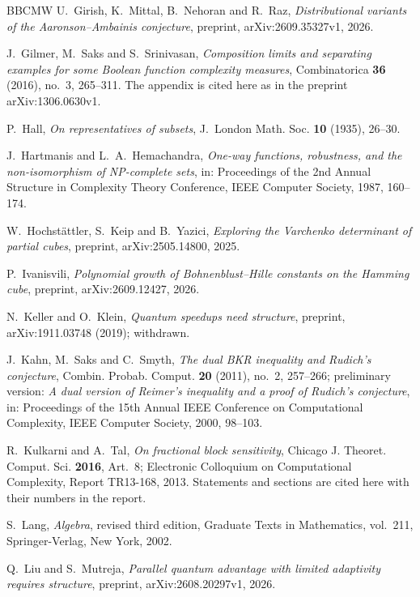 \documentclass[11pt,reqno]{amsart}
\theoremstyle{definition}
\theoremstyle{remark}
\numberwithin{equation}{section}
\theoremstyle{named}
\theoremstyle{plain}
\begin{document}
\begin{thebibliography}{BBCMW}
 U.~Girish, K.~Mittal, B.~Nehoran and R.~Raz, \emph{Distributional variants of the
Aaronson--Ambainis conjecture}, preprint, arXiv:2609.35327v1, 2026.

 J.~Gilmer, M.~Saks and S.~Srinivasan, \emph{Composition limits and separating
examples for some Boolean function complexity measures}, Combinatorica \textbf{36} (2016), no.~3,
265--311. The appendix is cited here as in the preprint arXiv:1306.0630v1.

 P.~Hall, \emph{On representatives of subsets}, J.~London Math. Soc. \textbf{10}
(1935), 26--30.

 J.~Hartmanis and L.~A.~Hemachandra, \emph{One-way functions, robustness, and the
non-isomorphism of NP-complete sets}, in: Proceedings of the 2nd Annual Structure in Complexity Theory
Conference, IEEE Computer Society, 1987, 160--174.

 W.~Hochst\"attler, S.~Keip and B.~Yazici, \emph{Exploring the Varchenko determinant
of partial cubes}, preprint, arXiv:2505.14800, 2025.

 P.~Ivanisvili, \emph{Polynomial growth of Bohnenblust--Hille constants on the
Hamming cube}, preprint, arXiv:2609.12427, 2026.

 N.~Keller and O.~Klein, \emph{Quantum speedups need structure}, preprint,
arXiv:1911.03748 (2019); withdrawn.

 J.~Kahn, M.~Saks and C.~Smyth, \emph{The dual BKR inequality and Rudich's
conjecture}, Combin. Probab. Comput. \textbf{20} (2011), no.~2, 257--266; preliminary version:
\emph{A dual version of Reimer's inequality and a proof of Rudich's conjecture}, in: Proceedings of
the 15th Annual IEEE Conference on Computational Complexity, IEEE Computer Society, 2000, 98--103.

 R.~Kulkarni and A.~Tal, \emph{On fractional block sensitivity}, Chicago J. Theoret.
Comput. Sci. \textbf{2016}, Art.~8; Electronic Colloquium on Computational Complexity, Report TR13-168,
2013. Statements and sections are cited here with their numbers in the report.

 S.~Lang, \emph{Algebra}, revised third edition, Graduate Texts in Mathematics,
vol.~211, Springer-Verlag, New York, 2002.

 Q.~Liu and S.~Mutreja, \emph{Parallel quantum advantage with limited adaptivity
requires structure}, preprint, arXiv:2608.20297v1, 2026.


\end{thebibliography}
\end{document}
